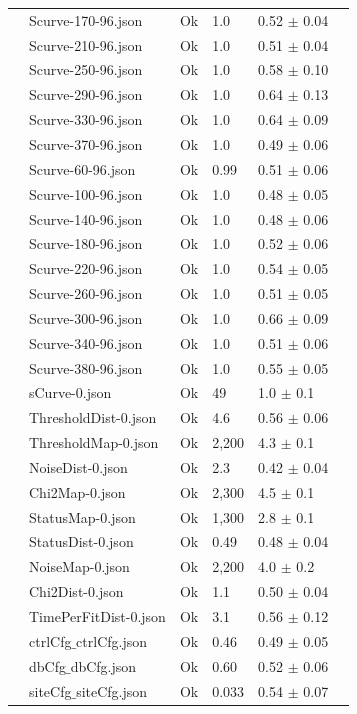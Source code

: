 \begin{longtable}{|llllll|}
 & Scurve-170-96.json & Ok & 1.0 & 0.52 $\pm$ 0.04 & \\
 & Scurve-210-96.json & Ok & 1.0 & 0.51 $\pm$ 0.04 & \\
 & Scurve-250-96.json & Ok & 1.0 & 0.58 $\pm$ 0.10 & \\
 & Scurve-290-96.json & Ok & 1.0 & 0.64 $\pm$ 0.13 & \\
 & Scurve-330-96.json & Ok & 1.0 & 0.64 $\pm$ 0.09 & \\
 & Scurve-370-96.json & Ok & 1.0 & 0.49 $\pm$ 0.06 & \\
 & Scurve-60-96.json & Ok & 0.99 & 0.51 $\pm$ 0.06 & \\
 & Scurve-100-96.json & Ok & 1.0 & 0.48 $\pm$ 0.05 & \\
 & Scurve-140-96.json & Ok & 1.0 & 0.48 $\pm$ 0.06 & \\
 & Scurve-180-96.json & Ok & 1.0 & 0.52 $\pm$ 0.06 & \\
 & Scurve-220-96.json & Ok & 1.0 & 0.54 $\pm$ 0.05 & \\
 & Scurve-260-96.json & Ok & 1.0 & 0.51 $\pm$ 0.05 & \\
 & Scurve-300-96.json & Ok & 1.0 & 0.66 $\pm$ 0.09 & \\
 & Scurve-340-96.json & Ok & 1.0 & 0.51 $\pm$ 0.06 & \\
 & Scurve-380-96.json & Ok & 1.0 & 0.55 $\pm$ 0.05 & \\
 & sCurve-0.json & Ok & 49 & 1.0 $\pm$ 0.1 & \\
 & ThresholdDist-0.json & Ok & 4.6 & 0.56 $\pm$ 0.06 & \\
 & ThresholdMap-0.json & Ok & 2,200 & 4.3 $\pm$ 0.1 & \\
 & NoiseDist-0.json & Ok & 2.3 & 0.42 $\pm$ 0.04 & \\
 & Chi2Map-0.json & Ok & 2,300 & 4.5 $\pm$ 0.1 & \\
 & StatusMap-0.json & Ok & 1,300 & 2.8 $\pm$ 0.1 & \\
 & StatusDist-0.json & Ok & 0.49 & 0.48 $\pm$ 0.04 & \\
 & NoiseMap-0.json & Ok & 2,200 & 4.0 $\pm$ 0.2 & \\
 & Chi2Dist-0.json & Ok & 1.1 & 0.50 $\pm$ 0.04 & \\
 & TimePerFitDist-0.json & Ok & 3.1 & 0.56 $\pm$ 0.12 & \\
 & ctrlCfg$\_$ctrlCfg.json & Ok & 0.46 & 0.49 $\pm$ 0.05 & \\
 & dbCfg$\_$dbCfg.json & Ok & 0.60 & 0.52 $\pm$ 0.06 & \\
 & siteCfg$\_$siteCfg.json & Ok & 0.033 & 0.54 $\pm$ 0.07 & \\

\end{longtable}

